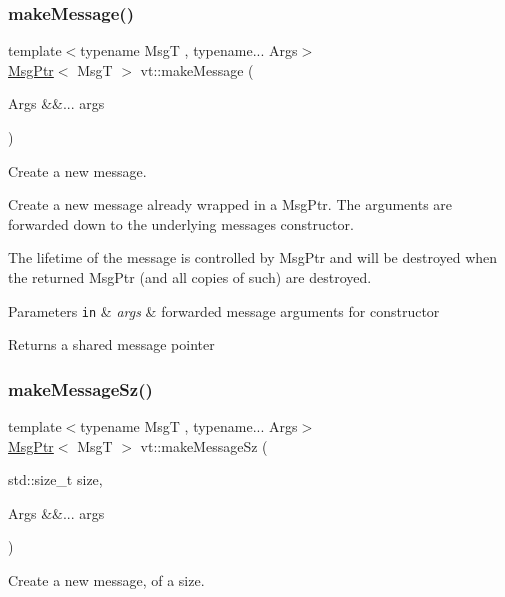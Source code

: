\subsubsection{\texorpdfstring{make\+Message()}{makeMessage()}}
{\footnotesize\ttfamily template$<$typename MsgT , typename... Args$>$ \\
\hyperlink{namespacevt_a9f5ebd62ee9d6dd8829e3e1cc4f858e9}{Msg\+Ptr}$<$ MsgT $>$ vt\+::make\+Message (\begin{DoxyParamCaption}\item[{Args \&\&...}]{args }\end{DoxyParamCaption})}



Create a new message. 

Create a new message already wrapped in a Msg\+Ptr. The arguments are forwarded down to the underlying message\textquotesingle{}s constructor.

The lifetime of the message is controlled by Msg\+Ptr and will be destroyed when the returned Msg\+Ptr (and all copies of such) are destroyed.


\begin{DoxyParams}[1]{Parameters}
\mbox{\tt in}  & {\em args} & forwarded message arguments for constructor\\
\hline
\end{DoxyParams}
\begin{DoxyReturn}{Returns}
a shared message pointer 
\end{DoxyReturn}
\mbox{\label{namespacevt_a02d4a45f1b229ac6fd5da4bf289d6654}} 
\subsubsection{\texorpdfstring{make\+Message\+Sz()}{makeMessageSz()}}
{\footnotesize\ttfamily template$<$typename MsgT , typename... Args$>$ \\
\hyperlink{namespacevt_a9f5ebd62ee9d6dd8829e3e1cc4f858e9}{Msg\+Ptr}$<$ MsgT $>$ vt\+::make\+Message\+Sz (\begin{DoxyParamCaption}\item[{std\+::size\+\_\+t}]{size,  }\item[{Args \&\&...}]{args }\end{DoxyParamCaption})}



Create a new message, of a size. 

